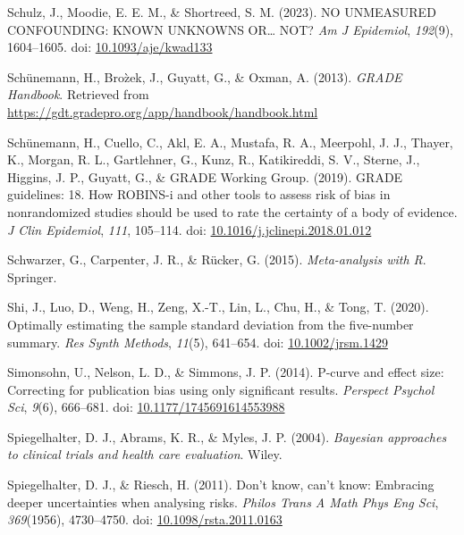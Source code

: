 \documentclass[
  letterpaper,
  DIV=11,
  numbers=noendperiod]{scrreprt}
\newlength{\cslhangindent}
\newlength{\cslentryspacingunit} %
\newenvironment{CSLReferences}[2] %
 {%
  \setlength{\parindent}{0pt}
  \ifodd #1
  \let\oldpar\par
  \def\par{\hangindent=\cslhangindent\oldpar}
  \fi
  \setlength{\parskip}{#2\cslentryspacingunit}
 }%
 {}
\begin{document}
\begin{CSLReferences}{1}{0}
\leavevmode{}%
Schulz, J., Moodie, E. E. M., \& Shortreed, S. M. (2023). NO UNMEASURED
CONFOUNDING: KNOWN UNKNOWNS OR{\ldots{}} NOT? \emph{Am J Epidemiol},
\emph{192}(9), 1604--1605. doi:
\href{https://doi.org/10.1093/aje/kwad133}{10.1093/aje/kwad133}

\leavevmode{}%
Schünemann, H., Broz̀ek, J., Guyatt, G., \& Oxman, A. (2013).
\emph{{GRADE Handbook}}. Retrieved from
\url{https://gdt.gradepro.org/app/handbook/handbook.html}

\leavevmode{}%
Schünemann, H., Cuello, C., Akl, E. A., Mustafa, R. A., Meerpohl, J. J.,
Thayer, K., Morgan, R. L., Gartlehner, G., Kunz, R., Katikireddi, S. V.,
Sterne, J., Higgins, J. P., Guyatt, G., \& GRADE Working Group. (2019).
GRADE guidelines: 18. How ROBINS-i and other tools to assess risk of
bias in nonrandomized studies should be used to rate the certainty of a
body of evidence. \emph{J Clin Epidemiol}, \emph{111}, 105--114. doi:
\href{https://doi.org/10.1016/j.jclinepi.2018.01.012}{10.1016/j.jclinepi.2018.01.012}

\leavevmode{}%
Schwarzer, G., Carpenter, J. R., \& Rücker, G. (2015).
\emph{Meta-analysis with {R}}. Springer.

\leavevmode{}%
Shi, J., Luo, D., Weng, H., Zeng, X.-T., Lin, L., Chu, H., \& Tong, T.
(2020). Optimally estimating the sample standard deviation from the
five-number summary. \emph{Res Synth Methods}, \emph{11}(5), 641--654.
doi: \href{https://doi.org/10.1002/jrsm.1429}{10.1002/jrsm.1429}

\leavevmode{}%
Simonsohn, U., Nelson, L. D., \& Simmons, J. P. (2014). P-curve and
effect size: Correcting for publication bias using only significant
results. \emph{Perspect Psychol Sci}, \emph{9}(6), 666--681. doi:
\href{https://doi.org/10.1177/1745691614553988}{10.1177/1745691614553988}

\leavevmode{}%
Spiegelhalter, D. J., Abrams, K. R., \& Myles, J. P. (2004).
\emph{Bayesian approaches to clinical trials and health care
evaluation}. Wiley.

\leavevmode{}%
Spiegelhalter, D. J., \& Riesch, H. (2011). Don't know, can't know:
Embracing deeper uncertainties when analysing risks. \emph{Philos Trans
A Math Phys Eng Sci}, \emph{369}(1956), 4730--4750. doi:
\href{https://doi.org/10.1098/rsta.2011.0163}{10.1098/rsta.2011.0163}


\end{CSLReferences}
\end{document}
